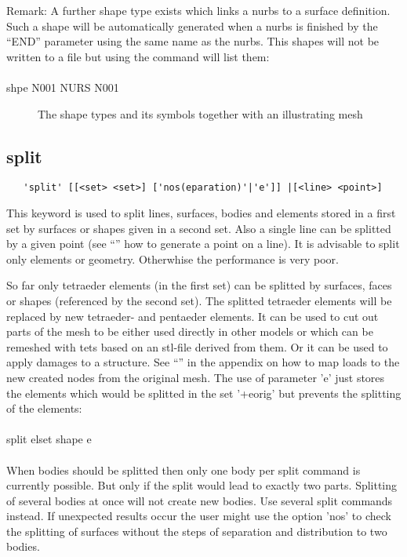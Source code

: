 \documentclass{article}
\begin{document}
Remark: A further shape type exists which links a nurbs to a surface definition. Such a shape will be automatically generated when a nurbs is finished by the ``END'' parameter using the same name as the nurbs. This shapes will not be written to a file but using the  command will list them:\\\\shpe N001 NURS N001

\begin{figure}[h]
\caption{\label{The shape types and its symbols together with an illustrating mesh}The shape types and its symbols together with an illustrating mesh}
\end{figure}

\subsection{\label{split}split}
\begin{verbatim}
   'split' [[<set> <set>] ['nos(eparation)'|'e']] |[<line> <point>]
\end{verbatim}
This keyword is used to split lines, surfaces, bodies and elements stored in a first set by surfaces or shapes given in a second set. Also a single line can be splitted by a given point (see ``'' how to generate a point on a line). It is advisable to split only elements or geometry. Otherwhise the performance is very poor.

So far only tetraeder elements (in the first set) can be splitted by surfaces, faces or shapes (referenced by the second set). The splitted tetraeder elements will be replaced by new tetraeder- and pentaeder elements. It can be used to cut out parts of the mesh to be either used directly in other models or which can be remeshed with tets based on an stl-file derived from them. Or it can be used to apply damages to a structure. See ``'' in the appendix on how to map loads to the new created nodes from the original mesh. The use of parameter 'e' just stores the elements which would be splitted in the set '+eorig' but prevents the splitting of the elements:
\\\\split elset shape e\\\\

When bodies should be splitted then only one body per split command is currently possible. But only if the split would lead to exactly two parts. Splitting of several bodies at once will not create new bodies. Use several split commands instead. If unexpected results occur the user might use the option 'nos' to check the splitting of surfaces without the steps of separation and distribution to two bodies.
\end{document}
